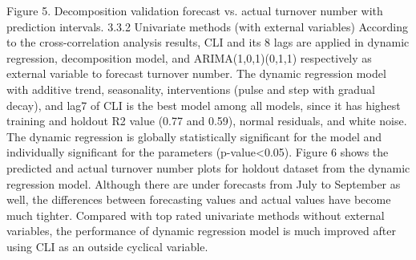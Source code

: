 Figure 5. Decomposition validation forecast vs. actual turnover number with prediction intervals.
3.3.2    Univariate methods (with external variables)
According to the cross-correlation analysis results, CLI and its 8 lags are applied in dynamic regression, decomposition model, and ARIMA(1,0,1)(0,1,1) respectively as external variable to forecast turnover number. The dynamic regression model with additive trend, seasonality, interventions (pulse and step with gradual decay), and lag7 of CLI is the best model among all models, since it has highest training and holdout R2 value (0.77 and 0.59), normal residuals, and white noise. The dynamic regression is globally statistically significant for the model and individually significant for the parameters (p-value<0.05). Figure 6 shows the predicted and actual turnover number plots for holdout dataset from the dynamic regression model. Although there are under forecasts from July to September as well, the differences between forecasting values and actual values have become much tighter. Compared with top rated univariate methods without external variables, the performance of dynamic regression model is much improved after using CLI as an outside cyclical variable.
  
